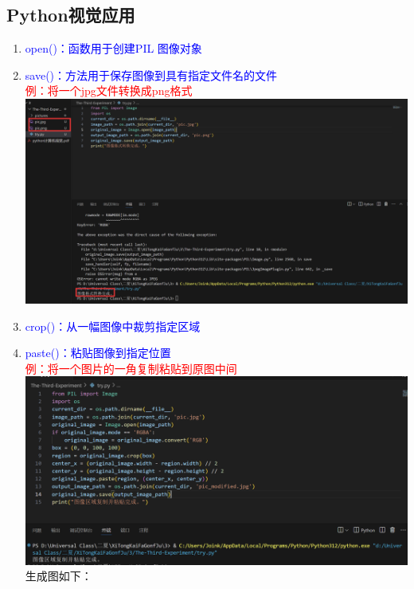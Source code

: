 \documentclass[12pt,a4paper,UTF8]{article}
\begin{document}
    \subsection{Python视觉应用}
    \begin{enumerate}
        \item \textcolor{blue}{open()：函数用于创建PIL 图像对象}\\
        \item \textcolor{blue}{save()：方法用于保存图像到具有指定文件名的文件}\\[8pt]
        \textcolor{red}{例：将一个jpg文件转换成png格式}\\
        \includegraphics[scale=0.25]{pictures/13.png}\\
        \item \textcolor{blue}{crop()：从一幅图像中裁剪指定区域}\\
        \item \textcolor{blue}{paste()：粘贴图像到指定位置}\\
        \textcolor{red}{例：将一个图片的一角复制粘贴到原图中间}\\
        \includegraphics[scale=0.25]{pictures/14.png}\\
        生成图如下：\\

\end{enumerate}
\end{document}
